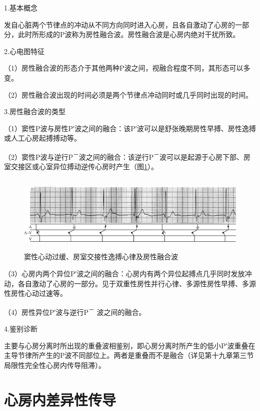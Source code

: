 1.基本概念

发自心脏两个节律点的冲动从不同方向同时进入心房，且各自激动了心房的一部分，此时所形成的P波称为房性融合波。房性融合波是心房内绝对干扰所致。

2.心电图特征

（1）房性融合波的形态介于其他两种P波之间，视融合程度不同，其形态可以多变。

（2）房性融合波出现的时间必须是两个节律点冲动同时或几乎同时出现的时间。

3.房性融合波的类型

（1）窦性P波与房性P′波之间的融合：该P′波可以是舒张晚期房性早搏、房性逸搏或人工心房起搏搏动等。

（2）窦性P波与逆行P\textsuperscript{－}波之间的融合：该逆行P\textsuperscript{－}波可以是起源于心房下部、房室交接区或心室异位搏动逆传心房时产生（图\ref{fig1-27}）。

\begin{figure}[!htbp]
 \centering
 \includegraphics[width=5.75in,height=1.47917in]{./images/Image00033.jpg}
 \captionsetup{justification=centering}
 \caption{窦性心动过缓、房室交接性逸搏心律及房性融合波}
 \label{fig1-27}
  \end{figure} 

（3）心房内两个异位P′波之间的融合：心房内有两个异位起搏点几乎同时发放冲动，各自激动了心房的一部分。见于双重性房性并行心律、多源性房性早搏、多源性房性心动过速等。

（4）房性异位P′波与逆行P\textsuperscript{－} 波之间的融合。

4.鉴别诊断

主要与心房分离时所出现的重叠波相鉴别，即心房分离时所产生的低小P′波重叠在主导节律所产生的P波不同部位上。两者是重叠而不是融合（详见第十九章第三节局限性完全性心房内传导阻滞）。

\protect\hypertarget{text00007.htmlux5cux23subid25}{}{}

\section{心房内差异性传导}

\protect\hypertarget{text00007.htmlux5cux23subid26}{}{}

